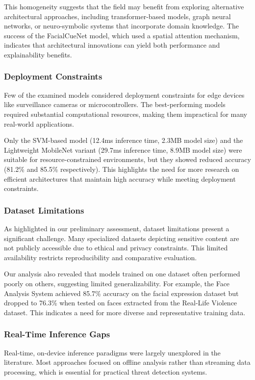 \documentclass[conference,compsoc]{IEEEtran}
\begin{document}
This homogeneity suggests that the field may benefit from exploring alternative architectural approaches, including transformer-based models, graph neural networks, or neuro-symbolic systems that incorporate domain knowledge. The success of the FacialCueNet model, which used a spatial attention mechanism, indicates that architectural innovations can yield both performance and explainability benefits.

\subsubsection{Deployment Constraints}
Few of the examined models considered deployment constraints for edge devices like surveillance cameras or microcontrollers. The best-performing models required substantial computational resources, making them impractical for many real-world applications.

Only the SVM-based model (12.4ms inference time, 2.3MB model size) and the Lightweight MobileNet variant (29.7ms inference time, 8.9MB model size) were suitable for resource-constrained environments, but they showed reduced accuracy (81.2\% and 85.5\% respectively). This highlights the need for more research on efficient architectures that maintain high accuracy while meeting deployment constraints.

\subsubsection{Dataset Limitations}
As highlighted in our preliminary assessment, dataset limitations present a significant challenge. Many specialized datasets depicting sensitive content are not publicly accessible due to ethical and privacy constraints. This limited availability restricts reproducibility and comparative evaluation.

Our analysis also revealed that models trained on one dataset often performed poorly on others, suggesting limited generalizability. For example, the Face Analysis System achieved 85.7\% accuracy on the facial expression dataset but dropped to 76.3\% when tested on faces extracted from the Real-Life Violence dataset. This indicates a need for more diverse and representative training data.

\subsubsection{Real-Time Inference Gaps}
Real-time, on-device inference paradigms were largely unexplored in the literature. Most approaches focused on offline analysis rather than streaming data processing, which is essential for practical threat detection systems.
\end{document}
